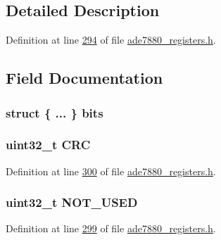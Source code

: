 \subsection{Detailed Description}


Definition at line \hyperlink{a00036_source_l00294}{294} of file \hyperlink{a00036_source}{ade7880\-\_\-registers.\-h}.



\subsection{Field Documentation}
\hypertarget{a00028_aa63013e67d51c4116401cb5b64e9b4fb}{
\subsubsection[{bits}]{\setlength{\rightskip}{0pt plus 5cm}struct \{ ... \}  bits}}\label{dc/d3c/a00028_aa63013e67d51c4116401cb5b64e9b4fb}
\hypertarget{a00028_ac47eb69b8f92811cf4ab6f12a84e0f4c}{
\subsubsection[{C\-R\-C}]{\setlength{\rightskip}{0pt plus 5cm}uint32\-\_\-t C\-R\-C}}\label{dc/d3c/a00028_ac47eb69b8f92811cf4ab6f12a84e0f4c}


Definition at line \hyperlink{a00036_source_l00300}{300} of file \hyperlink{a00036_source}{ade7880\-\_\-registers.\-h}.

\hypertarget{a00028_aa979856ee90a694e453f80dde4e52bc7}{
\subsubsection[{N\-O\-T\-\_\-\-U\-S\-E\-D}]{\setlength{\rightskip}{0pt plus 5cm}uint32\-\_\-t N\-O\-T\-\_\-\-U\-S\-E\-D}}\label{dc/d3c/a00028_aa979856ee90a694e453f80dde4e52bc7}


Definition at line \hyperlink{a00036_source_l00299}{299} of file \hyperlink{a00036_source}{ade7880\-\_\-registers.\-h}.

